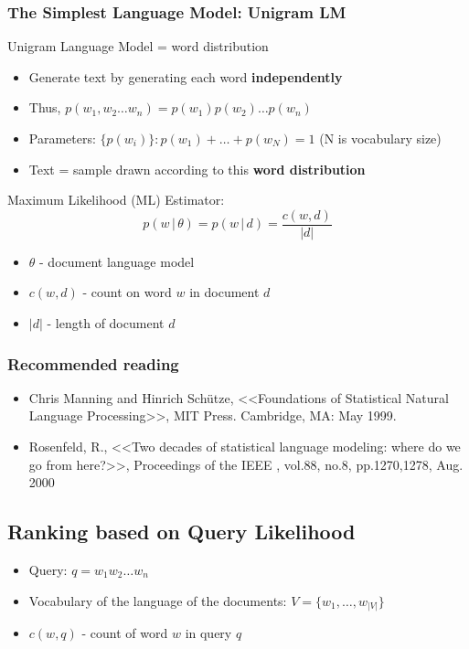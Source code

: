 \subsubsection{The Simplest Language Model: Unigram LM}
Unigram Language Model = word distribution
\begin{itemize}
\item Generate text by generating each word \textbf{independently} 
\item Thus, $p(w_1, w_2 \dots w_n) = p(w_1)p(w_2) \dots p(w_n)$
\item Parameters: $\{p(w_i)\}: p(w_1) + \ldots + p(w_N) = 1$ (N is vocabulary size)
\item Text = sample drawn according to this \textbf{word distribution}
\end{itemize}

Maximum Likelihood (ML) Estimator:
\begin{equation*}
p(w \,\big|\, \theta) = p(w \,\big|\, d) = \frac{c(w, d)}{|d|}
\end{equation*}
\begin{itemize}
\item $\theta$ - document language model
\item $c(w, d)$ - count on word $w$ in document $d$
\item $|d|$ - length of document $d$
\end{itemize}

\subsubsection{Recommended reading}
\begin{itemize}
\item Chris Manning and Hinrich Sch{\"u}tze, <<Foundations of Statistical Natural Language Processing>>, MIT Press. Cambridge, MA: May 1999.
\item  Rosenfeld, R., <<Two decades of statistical language modeling: where do we go from here?>>, Proceedings of the IEEE , vol.88, no.8, pp.1270,1278, Aug. 2000
\end{itemize}

\subsection{Ranking based on Query Likelihood}

\begin{itemize}
\item Query: $q = w_1 w_2 \dots w_n$
\item Vocabulary of the language of the documents: $V = \{ w_1, \dots ,w_{|V|} \}$
\item $c(w, q)$ - count of word $w$ in query $q$
\end{itemize}


